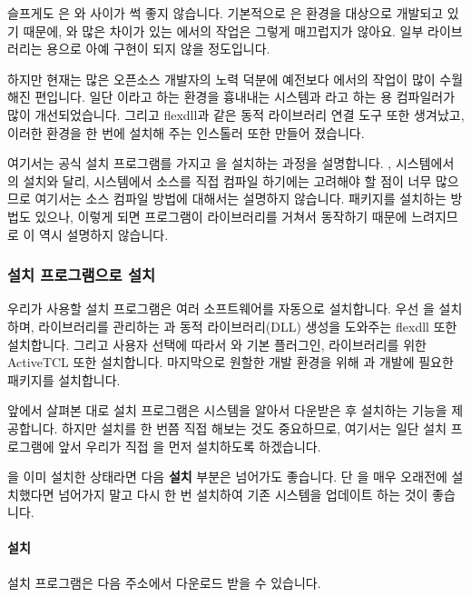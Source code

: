 슬프게도 \OCAML{}은 \WINDOWS{}와 사이가 썩 좋지 않습니다. 기본적으로
\OCAML{}은 \UNIX{} 환경을 대상으로 개발되고 있기 때문에, \UNIX{}와 많은 차이가
있는 \WINDOWS{}에서의 \OCAML{} 작업은 그렇게 매끄럽지가 않아요. 일부
라이브러리는 \WINDOWS{} 용으로 아예 구현이 되지 않을 정도입니다.

하지만 현재는 많은 오픈소스 개발자의 노력 덕분에 예전보다 \WINDOWS{}에서의
작업이 많이 수월해진 편입니다. 일단 \CYGWIN{}이라고 하는 \UNIX{} 환경을
흉내내는 시스템과 \MINGW{}라고 하는 \WINDOWS{} 용 \CC{} 컴파일러가 많이
개선되었습니다. 그리고 \textsf{flexdll}과 같은 동적 라이브러리 연결 도구 또한
생겨났고, 이러한 환경을 한 번에 설치해 주는 인스톨러 또한 만들어 졌습니다.

여기서는 \OCAML{} 공식 설치 프로그램를 가지고 \OCAML{}을 설치하는 과정을
설명합니다. \LINUX{}, \MAC{} 시스템에서의 설치와 달리, \WINDOWS{} 시스템에서
소스를 직접 컴파일 하기에는 고려해야 할 점이 너무 많으므로 여기서는 소스
컴파일 방법에 대해서는 설명하지 않습니다. \CYGWIN{} 패키지를 설치하는 방법도
있으나, 이렇게 되면 \OCAML{} 프로그램이 \CYGWIN{} 라이브러리를 거쳐서 동작하기
때문에 느려지므로 이 역시 설명하지 않습니다.

\subsubsection{설치 프로그램으로 설치}

우리가 사용할 설치 프로그램은 여러 소프트웨어를 자동으로 설치합니다. 우선
\OCAML{}을 설치하며, \OCAML{} 라이브러리를 관리하는 \FINDLIB{}과 동적
라이브러리(DLL) 생성을 도와주는 \textsf{flexdll} 또한 설치합니다. 그리고
사용자 선택에 따라서 \EMACS{}와 \OCAML{} 기본 \EMACS{} 플러그인, \TK{}
라이브러리를 위한 \textsf{ActiveTCL} 또한 설치합니다. 마지막으로 원할한
\OCAML{} 개발 환경을 위해 \CYGWIN{}과 개발에 필요한 패키지를 설치합니다.

앞에서 살펴본 대로 설치 프로그램은 \CYGWIN{} 시스템을 알아서 다운받은 후 설치하는
기능을 제공합니다. 하지만 \CYGWIN{} 설치를 한 번쯤 직접 해보는 것도
중요하므로, 여기서는 일단 설치 프로그램에 앞서 우리가 직접 \CYGWIN{}을 먼저
설치하도록 하겠습니다.

\CYGWIN{}을 이미 설치한 상태라면 다음 \textbf{\CYGWIN{} 설치} 부분은 넘어가도
좋습니다. 단 \CYGWIN{}을 매우 오래전에 설치했다면 넘어가지 말고 다시 한 번
설치하여 기존 시스템을 업데이트 하는 것이 좋습니다.

\paragraph{\CYGWIN{} 설치} \CYGWIN{} 설치 프로그램은 다음 주소에서
다운로드 받을 수 있습니다.

